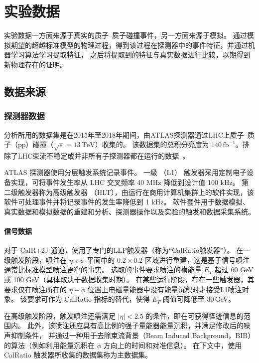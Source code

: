 
\chapter{实验数据}
实验数据一方面来源于真实的质子--质子碰撞事件，另一方面来源于模拟。
通过模拟期望的超越标准模型的物理过程，得到该过程在探测器中的事件特征，并通过机器学习算法学习提取特征，
之后将提取到的特征与真实数据进行比较，以期得到新物理存在的证明。

\section{数据来源}

\subsection{探测器数据}
\label{sec:background_data}

分析所用的数据集是在2015年至2018年期间，由ATLAS探测器通过LHC上质子--质子（pp）碰撞（$\sqrt{s} = 13\,\mathrm{TeV}$）收集的。
该数据集的总积分亮度为 $140\,\mathrm{fb}^{-1}$。排除了LHC束流不稳定或并非所有子探测器都在运行的数据~\cite{ATLAS_data_quality}。

ATLAS 探测器使用分层触发系统记录事件。
一级 （L1） 触发器采用定制电子设备实现，可将事件发生率从 LHC 交叉频率 40 MHz 降低到设计值 100 kHz。
第二级触发器称为高级触发器 （HLT），由运行在商用计算机集群上的软件实现，该软件可处理事件并将记录事件的发生率降低到 1 kHz。
软件套件用于数据模拟、真实数据和模拟数据的重建和分析、探测器操作以及实验的触发和数据采集系统。


\subsubsection{信号数据}
对于 CalR+2J 通道，使用了专门的LLP触发器（称为“CalRatio触发器”）。
在一级触发阶段，喷注在 $\eta \times \phi$ 平面中的 $0.2 \times 0.2$ 区域进行重建，这是基于信号喷注通常比标准模型喷注更窄的事实。
选取的事件要求喷注的横能量 $E_T$ 超过 60 GeV 或 100 GeV（具体取决于数据收集时期）。
在某些运行阶段，存在一些触发器，其要求仅在喷注所在的 $\eta - \phi$ 位置上电磁量能器中没有能量沉积时才接受L1喷注对象。
该要求可作为 CalRatio 指标的替代，使得 $E_T$ 阈值可降低至 30\,GeV。

在高级触发阶段，触发喷注还需满足 $|\eta| < 2.5$ 的条件，即在可获得径迹信息的范围内。
此外，该喷注还应具有高比例的强子量能器能量沉积，并满足修改后的噪声抑制条件，
并通过一种用于去除束流背景（Beam Induced Background，BIB）的算法（例如利用能量沉积在 $\phi$ 方向上的时间和对准信息）。
在下文中，使用 CalRatio 触发器所收集的数据集称为主数据集。

